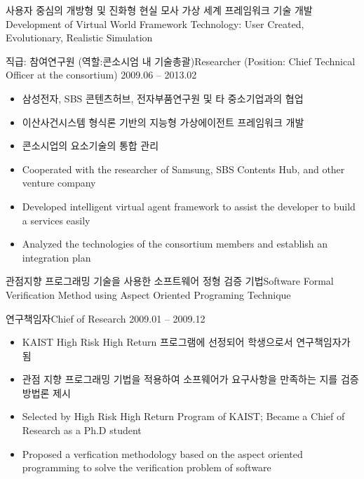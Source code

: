 \documentclass[english,representative]{resume_structure}
\begin{document}
\begin{Project}
{사용자 중심의 개방형 및 진화형 현실 모사 가상 세계 프레임워크 기술 개발}{Development of Virtual World Framework Technology: User Created, Evolutionary, Realistic Simulation}
{}{} 
{
\ResumeSubSection %
    {직급: 참여연구원 (역할:콘소시엄 내 기술총괄)}{Researcher (Position: Chief Technical Officer at the consortium)}
    {2009.06 -- 2013.02}
    {
      \begin{itemize}
        \item 삼성전자, SBS 콘텐츠허브, 전자부품연구원 및 타 중소기업과의 협업
        \item 이산사건시스템 형식론 기반의 지능형 가상에이전트 프레임워크 개발
        \item 콘소시업의 요소기술의 통합 관리
      \end{itemize}
    }
    {
      \begin{itemize}
        \item Cooperated with the researcher of Samsung, SBS Contents Hub, and other venture company
        \item Developed intelligent virtual agent framework to assist the developer to build a services easily
        \item Analyzed the technologies of the consortium members and establish an integration plan
      \end{itemize}
    }
}

{관점지향 프로그래밍 기술을 사용한 소프트웨어 정형 검증 기법}{Software Formal Verification Method using Aspect Oriented Programing Technique}
{}{} 
{
\ResumeSubSection %
    {연구책임자}{Chief of Research}
    {2009.01 -- 2009.12}
    {
      \begin{itemize}
        \item KAIST High Risk High Return 프로그램에 선정되어 학생으로서 연구책임자가 됨
        \item 관점 지향 프로그래밍 기법을 적용하여 소프웨어가 요구사항을 만족하는 지를 검증 방법론 제시
      \end{itemize}
    }
    {
      \begin{itemize}
        \item Selected by High Risk High Return Program of KAIST; Became a Chief of Research as a Ph.D student
        \item Proposed a verfication methodology based on the aspect oriented programming to solve the verification problem of software
      \end{itemize}
    }
}


\end{Project}
\end{document}
